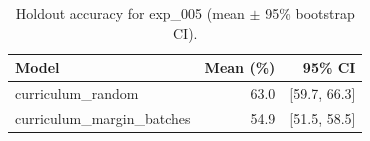 \begin{table}[ht]
\centering
\caption{Holdout accuracy for exp_005 (mean $\pm$ 95\% bootstrap CI).}
\label{tab:exp_005}
\begin{tabular}{lrr}
\toprule
Model & Mean (\%) & 95\% CI \\
\midrule
curriculum\_random & 63.0 & [59.7, 66.3] \\
curriculum\_margin\_batches & 54.9 & [51.5, 58.5] \\
\bottomrule
\end{tabular}
\end{table}
